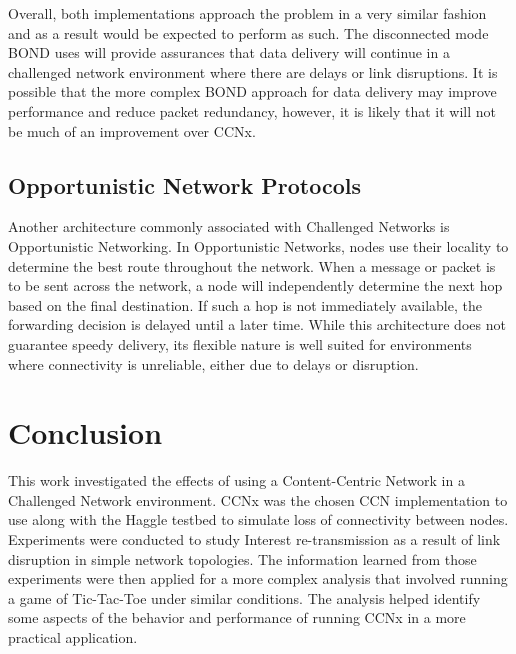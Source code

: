 \documentclass[a4paper,12pt]{report}      %
\begin{document}
Overall, both implementations approach the problem in a very similar fashion and as a result
would be expected to perform as such. The disconnected mode BOND uses will provide assurances
that data delivery will continue in a challenged network environment where there are delays or link
disruptions. It is possible that the more complex BOND approach for data delivery may improve
performance and reduce packet redundancy, however, it is likely that it will not be much of an
improvement over CCNx.

\section{Opportunistic Network Protocols}

Another architecture commonly associated with Challenged Networks is Opportunistic Networking. In
Opportunistic Networks, nodes use their locality to determine the best route throughout the network.
When a message or packet is to be sent across the network, a node will independently determine the
next hop based on the final destination. If such a hop is not immediately available, the forwarding
decision is delayed until a later time. While this architecture does not guarantee speedy delivery, its
flexible nature is well suited for environments where connectivity is unreliable, either due to delays or
disruption\cite{oppnets}.

\pagebreak
\chapter{Conclusion}

This work investigated the effects of using a Content-Centric Network in a Challenged Network environment. CCNx was the chosen
CCN implementation to use along with the Haggle testbed to simulate loss of connectivity between nodes. Experiments were
conducted to study Interest re-transmission as a result of link disruption in simple network topologies. The
information learned from those experiments were then applied for a more complex analysis that involved running a
game of Tic-Tac-Toe under similar conditions. The analysis helped identify some aspects of the behavior and performance of
running CCNx in a more practical application.
\end{document}
